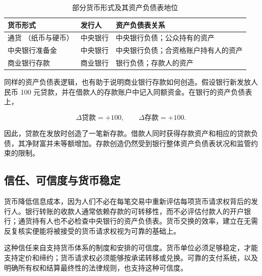 \begin{table}[H]
\centering
\caption{部分货币形式及其资产负债表地位}
\label{tab:ch2-money-claims}

\renewcommand{\arraystretch}{1.15}
\setlength{\tabcolsep}{7pt}

\begin{tabularx}{\textwidth}{
    @{}
    >{\raggedright\arraybackslash}p{3.35cm}
    >{\raggedright\arraybackslash}p{2.85cm}
    >{\raggedright\arraybackslash}X
    @{}
}
\toprule
\textbf{货币形式}
& \textbf{发行人}
& \textbf{资产负债表关系} \\
\midrule

通货\newline
{\small （纸币与硬币）}
& 中央银行
& 中央银行负债；公众持有的资产 \\
\addlinespace[0.3em]

中央银行准备金
& 中央银行
& 中央银行负债；合资格账户持有人的资产 \\
\addlinespace[0.3em]

商业银行存款
& 商业银行
& 银行负债；存款人的资产 \\

\bottomrule
\end{tabularx}
\end{table}

同样的资产负债表逻辑，也有助于说明商业银行存款如何创造。假设银行新发放人民币 100 元贷款，并在借款人的存款账户中记入同额资金。在银行的资产负债表上，

\begin{equation}
\Delta \text{贷款}=+100,
\qquad
\Delta \text{存款}=+100.
\label{eq:ch2-loan-deposit}
\end{equation}

因此，贷款在发放时创造了一笔新存款。借款人同时获得存款资产和相应的贷款负债，其净财富并未等额增加。存款创造仍然受到银行整体资产负债表状况和监管约束的限制。

\subsection{信任、可信度与货币稳定}

货币降低信息成本，因为人们不必在每笔交易中重新评估每项货币请求权背后的发行人。银行转账的收款人通常依赖存款的可转移性，而不必评估付款人的开户银行；通货持有人也不必检查中央银行的资产负债表。货币交换的效率，建立在无需反复核实便能将被接受的货币请求权视为可靠的基础上。

这种信任来自支持货币体系的制度和安排的可信度。货币单位必须足够稳定，才能支持定价和缔约；货币请求权必须能够按承诺转移或兑换。可靠的支付系统，以及明确所有权和结算最终性的法律规则，也支持这种可信度。

